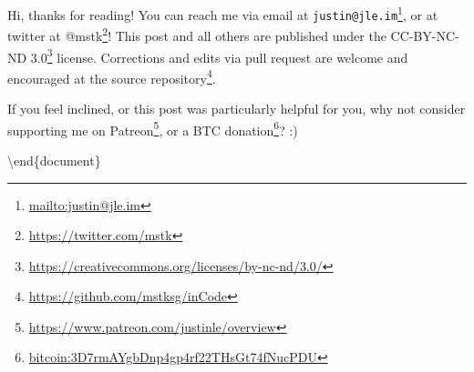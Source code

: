 \documentclass[]{article}
\renewcommand{\href}[2]{#2\footnote{\url{#1}}}
\begin{document}
Hi, thanks for reading! You can reach me via email at
\href{mailto:justin@jle.im}{\nolinkurl{justin@jle.im}}, or at twitter at
\href{https://twitter.com/mstk}{@mstk}! This post and all others are published
under the \href{https://creativecommons.org/licenses/by-nc-nd/3.0/}{CC-BY-NC-ND
3.0} license. Corrections and edits via pull request are welcome and encouraged
at \href{https://github.com/mstksg/inCode}{the source repository}.

If you feel inclined, or this post was particularly helpful for you, why not
consider \href{https://www.patreon.com/justinle/overview}{supporting me on
Patreon}, or a \href{bitcoin:3D7rmAYgbDnp4gp4rf22THsGt74fNucPDU}{BTC donation}?
:)

\textbackslash end\{document\}
\end{document}
